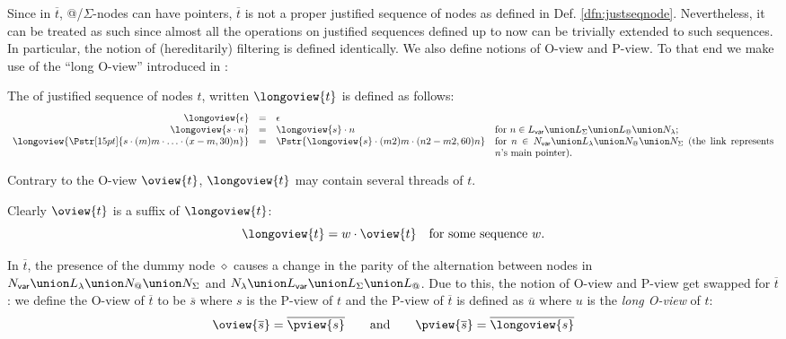 Since in $\overline{t}$, @/$\Sigma$-nodes can have pointers,
$\overline{t}$ is not a proper justified sequence of nodes as
defined in Def. \ref{dfn:justseqnode}. Nevertheless, it can be
treated as such since almost all the operations on justified
sequences defined up to now can be trivially extended to such
sequences. In particular, the notion of (hereditarily) filtering is
defined identically. We also define notions of O-view and P-view. To
that end we make use of the ``long O-view'' introduced in
\cite{Harmer2005}:
\begin{definition}
The  of justified sequence of nodes $t$,
written $\longoview{t}$ is defined as follows:
$$\begin{array}{rcll}
 \longoview{\epsilon} &=&  \epsilon \\
 \longoview{s \cdot n }  &=&  \longoview{s} \cdot n
    & \mbox{for $n \in L_{\sf var} \union L_\Sigma \union L_@ \union N_\lambda$;}
    \\
 \longoview{\Pstr[15pt]{s \cdot (m){m} \cdot \ldots \cdot (x-m,30){n}}} &=&
    \Pstr{ \longoview{s} \cdot (m2){m} \cdot (n2-m2,60){n} }
    & \parbox[t]{10cm}{for $n \in N_{\sf var} \union L_\lambda \union N_@ \union N_\Sigma$ (the link represents $n$'s main pointer).}
\end{array}$$
\end{definition}
Contrary to the O-view $\oview{t}$, $\longoview{t}$ may contain
several threads of $t$.

 Clearly  $\oview{t}$ is a suffix of
$\longoview{t}$:
\begin{equation}
  \longoview{t} = w \cdot \oview{t} \quad \mbox{for some sequence $w$.} \label{eqn:oview_suffix_longoview}
\end{equation}

In $\overline{t}$, the presence of the dummy node $\diamond$ causes
a change in the parity of the alternation between nodes in $N_{\sf
var} \union L_\lambda \union N_@ \union N_\Sigma$ and $N_\lambda
\union L_{\sf var} \union L_\Sigma \union L_@$. Due to this, the
notion of O-view and P-view get swapped for $\overline{t}$: we
define the O-view of $\overline{t}$ to be $\overline{s}$ where $s$
is the P-view of $t$ and the P-view of $\overline{t}$ is defined as
$\overline{u}$ where $u$ is the \emph{long O-view} of $t$:
\begin{equation}
\oview{\overline{s}} = \overline{\pview{s}} \qquad
\mbox{and}
\qquad  \pview{\overline{s}} =
\overline{\longoview{s}} \label{eqn:def_pview_oview_hat}
\end{equation}

